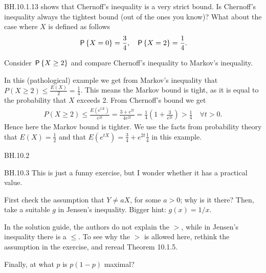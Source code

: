 \begin{exercise}
BH.10.1.13 shows that Chernoff's inequality is a very strict bound.
Is Chernoff's inequality always the tightest bound (out of the ones you know)?
What about the case where $X$ is defined as follows
\begin{align*}
    &\P{X=0} = \frac{3}{4}, & \P{X=2} = \frac{1}{4}.
\end{align*}

\begin{hint}
  Consider $\P{X\geq2}$ and compare Chernoff's inequality to Markov's inequality.
\end{hint}

\begin{solution}
In this (pathological) example we get from Markov's inequality that $P(X\geq 2) \leq \frac{E(X)}{2}=\frac{1}{4}$. This means the Markov bound is tight, as it is equal to the probability that $X$ exceeds 2. From Chernoff's bound we get
\begin{align*}
    P(X\geq 2)\leq \frac{E(e^{t  X})}{e^{2t}} = \frac{3+e^{2t}}{4 e^{2t}} = \frac{1}{4}\left(1+\frac{3}{e^{2t}}\right) > \frac{1}{4}\quad\forall t>0.
\end{align*} Hence here the Markov bound is tighter. We use the facts from probability theory that $E(X)=\frac12$ and that $E(e^{t X})=\frac34+e^{2 t}\frac14$ in this example.
\end{solution}
\end{exercise}


\begin{exercise}
BH.10.2
\end{exercise}

\begin{exercise}
BH.10.3
This is just a funny exercise, but I wonder whether it has a practical value.
\begin{hint}
First check the assumption that $Y\neq a X$, for some $a>0$; why is it there?
Then, take a suitable $g$ in Jensen's inequality.
Bigger hint: $g(x)=1/x$.

In the solution guide, the authors do not explain the $>$, while in Jensen's inequality there is a $\leq$. To see why the $>$ is allowed here, rethink the assumption in the exercise, and reread Theorem 10.1.5.

Finally, at what $p$ is $p(1-p)$ maximal?
\end{hint}
\end{exercise}

